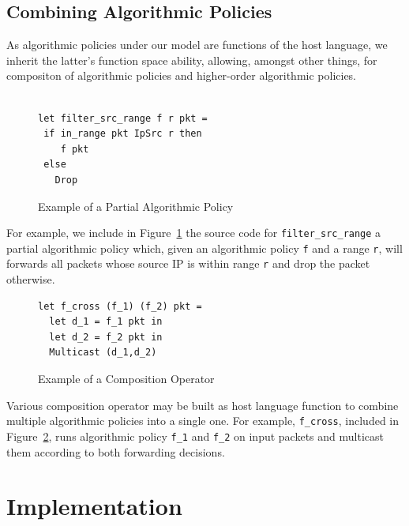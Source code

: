 \documentclass[preprint]{sigplanconf}
\begin{document}
   \subsection*{Combining Algorithmic Policies}
   As algorithmic policies under our model are functions of the host language, we inherit the latter's function space ability, allowing, amongst other things, for compositon of algorithmic policies and higher-order algorithmic policies.

\begin{figure}[ht]
\begin{lstlisting}

let filter_src_range f r pkt =
 if in_range pkt IpSrc r then
    f pkt
 else
   Drop   
\end{lstlisting}

\caption{Example of a Partial Algorithmic Policy}
\label{fig:ex-hole}
\end{figure}

   
   For example, we include in Figure~\ref{fig:ex-hole} the source code for \lstinline|filter_src_range| a partial algorithmic policy which, given an algorithmic policy \lstinline|f| and a range \lstinline|r|, will forwards all packets whose source IP is within range \lstinline|r| and drop the packet otherwise. 


   \begin{figure}[ht]
\begin{lstlisting}
let f_cross (f_1) (f_2) pkt =
  let d_1 = f_1 pkt in
  let d_2 = f_2 pkt in
  Multicast (d_1,d_2)
\end{lstlisting}

\caption{Example of a Composition Operator}
\label{fig:ex-cross}
\end{figure}
   
Various composition operator may be built as host language function to combine multiple algorithmic policies into a single one. For example, \lstinline|f_cross|, included in Figure~\ref{fig:ex-cross}, runs algorithmic policy \lstinline|f_1| and \lstinline|f_2| on input packets and multicast them according to both forwarding decisions. 
   
\section*{Implementation}
\end{document}
